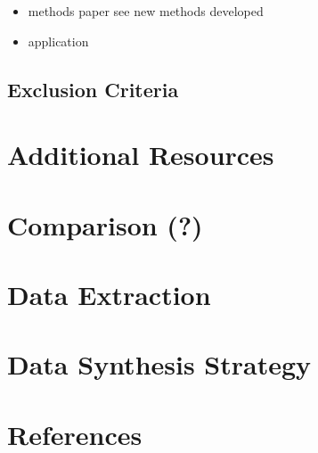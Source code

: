 \documentclass[
]{article}
\begin{document}
\begin{itemize}
\item
  methods paper see new methods developed
\item
  application
\end{itemize}

\hypertarget{exclusion-criteria}{%
\subsection{Exclusion Criteria}\label{exclusion-criteria}}

\hypertarget{additional-resources}{%
\section{Additional Resources}\label{additional-resources}}

\hypertarget{comparison}{%
\section{Comparison (?)}\label{comparison}}

\hypertarget{data-extraction}{%
\section{Data Extraction}\label{data-extraction}}

\hypertarget{data-synthesis-strategy}{%
\section{Data Synthesis Strategy}\label{data-synthesis-strategy}}

\hypertarget{references}{%
\section{References}\label{references}}
\end{document}
